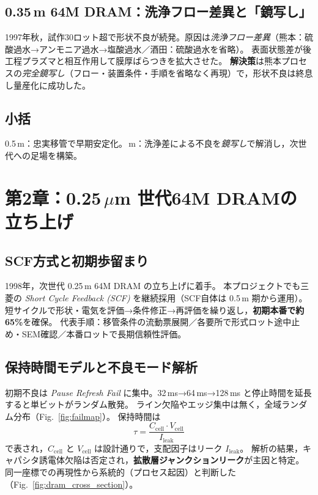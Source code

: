 \documentclass[conference]{IEEEtran}
\begin{document}
\subsection{0.35\,\textmu m 64M DRAM：洗浄フロー差異と「鏡写し」}
1997年秋，試作30ロット超で形状不良が続発。原因は\emph{洗浄フロー差異}（熊本：硫酸過水→アンモニア過水→塩酸過水／酒田：硫酸過水を省略）。
表面状態差が後工程プラズマと相互作用して膜厚ばらつきを拡大させた。
\textbf{解決策}は熊本プロセスの\emph{完全鏡写し}（フロー・装置条件・手順を省略なく再現）で，形状不良は終息し量産化に成功した。

\subsection*{小括}
0.5\,\textmu m：忠実移管で早期安定化。\,\textmu m：洗浄差による不良を\emph{鏡写し}で解消し，次世代への足場を構築。

\section{第2章：0.25\,\texorpdfstring{$\mu$m}{μm} 世代64M DRAMの立ち上げ}

\subsection{SCF方式と初期歩留まり}
1998年，次世代 0.25\,\textmu m 64M DRAM の立ち上げに着手。
本プロジェクトでも三菱の \emph{Short Cycle Feedback (SCF)} を継続採用（SCF自体は 0.5\,\textmu m 期から運用）。
短サイクルで形状・電気を評価→条件修正→再評価を繰り返し，\textbf{初期本番で約65\%}を確保。
代表手順：移管条件の流動票展開／各要所で形式ロット途中止め・SEM確認／本番ロットで長期信頼性評価。

\subsection{保持時間モデルと不良モード解析}
初期不良は \emph{Pause Refresh Fail} に集中。32\,ms→64\,ms→128\,ms と停止時間を延長すると単ビットがランダム散発。
ライン欠陥やエッジ集中は無く，全域ランダム分布（Fig.~\ref{fig:failmap}）。
保持時間は
\begin{equation}
\tau=\frac{C_{\mathrm{cell}} \cdot V_{\mathrm{cell}}}{I_{\mathrm{leak}}}
\end{equation}
で表され，$C_{\mathrm{cell}}$ と $V_{\mathrm{cell}}$ は設計通りで，支配因子はリーク $I_{\mathrm{leak}}$。
解析の結果，キャパシタ誘電体欠陥は否定され，\textbf{拡散層ジャンクションリーク}が主因と特定。
同一座標での再現性から系統的（プロセス起因）と判断した（Fig.~\ref{fig:dram_cross_section}）。
\end{document}

